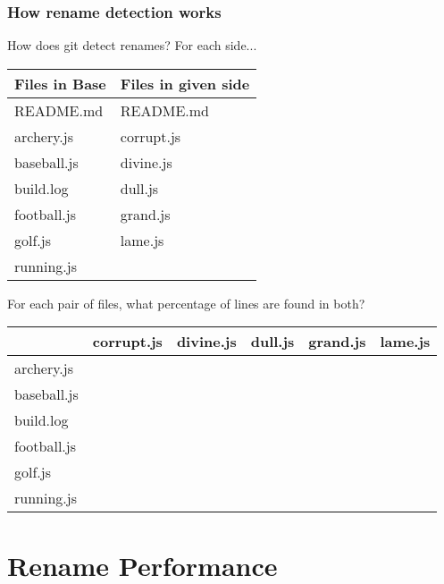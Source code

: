 \documentclass[compress,t]{beamer}
\begin{document}
\begin{frame}
  \frametitle{How rename detection works}

  How does git detect renames?  For each side...\\[0.25em]
  \pause
  \vspace*{-1.0\baselineskip}
  \begin{center}
    {\footnotesize
    \begin{tabular}{l|l}
      Files in Base  &  Files in given side \\
      \hline
      README.md      &  README.md   \\
      archery.js     &  corrupt.js  \\
      baseball.js    &  divine.js   \\
      build.log      &  dull.js     \\
      football.js    &  grand.js    \\
      golf.js        &  lame.js     \\
      running.js     &
    \end{tabular}
    }
  \end{center}
  \vspace*{-1.5\baselineskip}

  \pause
  \vspace*{\baselineskip}
  For each pair of files, what percentage of lines are found in both?
  \pause
  \vspace*{-0.25\baselineskip}
  \begin{center}
    {\footnotesize
    \begin{tabular}{l|l|l|l|l|l}
                   & corrupt.js & divine.js & dull.js & grand.js & lame.js \\
      \hline
      archery.js   &&&&& \\
      baseball.js  &&&&& \\
      build.log    &&&&& \\
      football.js  &&&&& \\
      golf.js      &&&&& \\
      running.js   &&&&&
    \end{tabular}
    }
  \end{center}

\end{frame}

\section[Renames]{Rename Performance}
\end{document}
